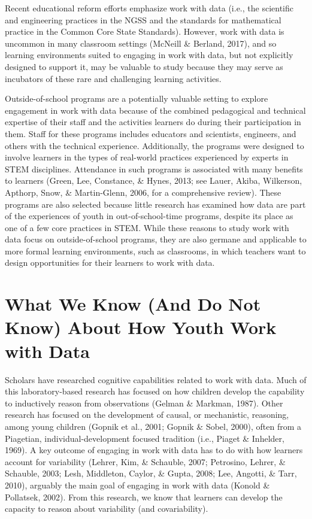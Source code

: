 \documentclass[]{msu-thesis}
\theoremstyle{definition}
\theoremstyle{definition}
\theoremstyle{definition}
\theoremstyle{remark}
\begin{document}
Recent educational reform efforts emphasize work with data (i.e., the
scientific and engineering practices in the NGSS and the standards for
mathematical practice in the Common Core State Standards). However, work
with data is uncommon in many classroom settings (McNeill \& Berland,
2017), and so learning environments suited to engaging in work with
data, but not explicitly designed to support it, may be valuable to
study because they may serve as incubators of these rare and challenging
learning activities.

Outside-of-school programs are a potentially valuable setting to explore
engagement in work with data because of the combined pedagogical and
technical expertise of their staff and the activities learners do during
their participation in them. Staff for these programs includes educators
and scientists, engineers, and others with the technical experience.
Additionally, the programs were designed to involve learners in the
types of real-world practices experienced by experts in STEM
disciplines. Attendance in such programs is associated with many
benefits to learners (Green, Lee, Constance, \& Hynes, 2013; see Lauer,
Akiba, Wilkerson, Apthorp, Snow, \& Martin-Glenn, 2006, for a
comprehensive review). These programs are also selected because little
research has examined how data are part of the experiences of youth in
out-of-school-time programs, despite its place as one of a few core
practices in STEM. While these reasons to study work with data focus on
outside-of-school programs, they are also germane and applicable to more
formal learning environments, such as classrooms, in which teachers want
to design opportunities for their learners to work with data.

\section{What We Know (And Do Not Know) About How Youth Work with
Data}\label{what-we-know-and-do-not-know-about-how-youth-work-with-data}

Scholars have researched cognitive capabilities related to work with
data. Much of this laboratory-based research has focused on how children
develop the capability to inductively reason from observations (Gelman
\& Markman, 1987). Other research has focused on the development of
causal, or mechanistic, reasoning, among young children (Gopnik et al.,
2001; Gopnik \& Sobel, 2000), often from a Piagetian,
individual-development focused tradition (i.e., Piaget \& Inhelder,
1969). A key outcome of engaging in work with data has to do with how
learners account for variability (Lehrer, Kim, \& Schauble, 2007;
Petrosino, Lehrer, \& Schauble, 2003; Lesh, Middleton, Caylor, \& Gupta,
2008; Lee, Angotti, \& Tarr, 2010), arguably the main goal of engaging
in work with data (Konold \& Pollatsek, 2002). From this research, we
know that learners can develop the capacity to reason about variability
(and covariability).
\end{document}
